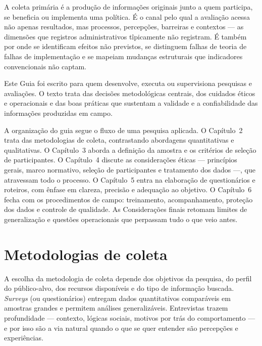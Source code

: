 \documentclass[12pt, a4paper, openany]{book}
\begin{document}
A coleta prim\'aria \'e a produ\c{c}\~ao de informa\c{c}\~oes originais junto a quem participa, se beneficia ou implementa uma pol\'itica. \'E o canal pelo qual a avalia\c{c}\~ao acessa n\~ao apenas resultados, mas processos, percep\c{c}\~oes, barreiras e contextos --- as dimens\~oes que registros administrativos t\^ipicamente n\~ao registram. \'E tamb\'em por onde se identificam efeitos n\~ao previstos, se distinguem falhas de teoria de falhas de implementa\c{c}\~ao e se mapeiam mudan\c{c}as estruturais que indicadores convencionais n\~ao captam.

Este Guia foi escrito para quem desenvolve, executa ou supervisiona pesquisas e avalia\c{c}\~oes. O texto trata das decis\~oes metodol\'ogicas centrais, dos cuidados \'eticos e operacionais e das boas pr\'aticas que sustentam a validade e a confiabilidade das informa\c{c}\~oes produzidas em campo.

A organiza\c{c}\~ao do guia segue o fluxo de uma pesquisa aplicada. O Cap\'itulo~2 trata das metodologias de coleta, contrastando abordagens quantitativas e qualitativas. O Cap\'itulo~3 aborda a defini\c{c}\~ao da amostra e os crit\'erios de sele\c{c}\~ao de participantes. O Cap\'itulo~4 discute as considera\c{c}\~oes \'eticas --- princ\'ipios gerais, marco normativo, sele\c{c}\~ao de participantes e tratamento dos dados ---, que atravessam todo o processo. O Cap\'itulo~5 entra na elabora\c{c}\~ao de question\'arios e roteiros, com \^enfase em clareza, precis\~ao e adequa\c{c}\~ao ao objetivo. O Cap\'itulo~6 fecha com os procedimentos de campo: treinamento, acompanhamento, prote\c{c}\~ao dos dados e controle de qualidade. As Considera\c{c}\~oes finais retomam limites de generaliza\c{c}\~ao e quest\~oes operacionais que perpassam tudo o que veio antes.

\chapter{Metodologias de coleta}

A escolha da metodologia de coleta depende dos objetivos da pesquisa, do perfil do p\'ublico-alvo, dos recursos dispon\'iveis e do tipo de informa\c{c}\~ao buscada. \textit{Surveys} (ou question\'arios) entregam dados quantitativos compar\'aveis em amostras grandes e permitem an\'alises generaliz\'aveis. Entrevistas trazem profundidade --- contexto, l\'ogicas sociais, motivos por tr\'as do comportamento --- e por isso s\~ao a via natural quando o que se quer entender s\~ao percep\c{c}\~oes e experi\^encias.
\end{document}
